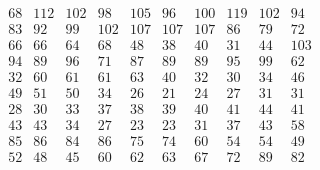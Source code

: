 \documentclass[12pt,oneside,a4paper]{article}
\begin{document}
\begin{equation}
  \tag{Mean Tabu Duration by city table 19}
  \begin{smallmatrix} 68 & 112 & 102 & 98 & 105  & 96 & 100 & 119 & 102 & 94 \\
    83 & 92 & 99 & 102 & 107 & 107 & 107 & 86 & 79 & 72 \\ 
    66 & 66 & 64 & 68 & 48 & 38 & 40 & 31 & 44 & 103 \\
    94 & 89 & 96 & 71 & 87 & 89 & 89 & 95 & 99 & 62 \\
    32 & 60 & 61 & 61 & 63 & 40 & 32 & 30 & 34 & 46 \\
    49 & 51 & 50 & 34 & 26 & 21 & 24 & 27 & 31 & 31 \\
    28 & 30 & 33 & 37 & 38 & 39 & 40 & 41 & 44 & 41 \\
    43 & 43 & 34 & 27 & 23 & 23 & 31 & 37 & 43 & 58 \\
    85 & 86 & 84 & 86 & 75 & 74 & 60 & 54 & 54 & 49 \\
    52 & 48 & 45 & 60 & 62 & 63 & 67 & 72 & 89 & 82 \\
  \end{smallmatrix}
\end{equation}

\begin{table}[h]
  \caption{Average of the parameters for the four configurations}
\end{table}
\end{document}
